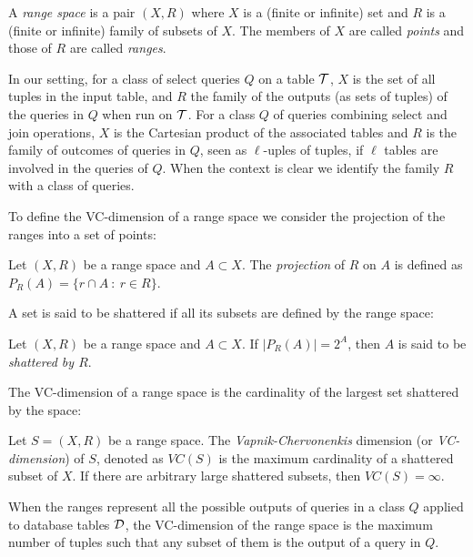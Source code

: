 \begin{definition}\label{definition:rangespace}
  A {\em range space} is a pair $(X,R)$ where $X$ is a (finite or infinite) set
  and $R$ is a (finite or infinite) family of subsets of $X$. The members of $X$
  are called {\em points} and those of $R$ are called {\em ranges}.
\end{definition}

In our setting, for a class of select queries $Q$ on a table ${\cal T}$, $X$ is the
set of all tuples in the input table, and $R$ the family of the outputs (as sets
of tuples) of the queries in $Q$ when run on 
${\cal T}$. For a class
$Q$ of queries combining select and join operations, $X$ is the Cartesian
product of the associated tables and $R$ is the family of outcomes of queries in
$Q$, seen as $\ell$-uples of tuples, if $\ell$ tables are involved in the
queries of $Q$.  When the context is clear we identify the family $R$ with a
class of queries.

To define the VC-dimension of a range space we consider the projection of the
ranges into a set of points:

\begin{definition}\label{definition:proj}
  Let $(X,R)$ be a range space and $A\subset X$. The {\em projection} of $R$ on
  $A$ is defined as $P_R(A)=\{r\cap A ~:~ r\in R\}$.
\end{definition}

A set is said to be shattered if all its subsets are defined by the range space:

\begin{definition}\label{definition:shatter}
  Let $(X,R)$ be a range space and $A\subset X$. If $|P_R(A)|=2^A$, then $A$ is
  said to be {\em shattered by $R$}.
\end{definition}

The VC-dimension of a range space is the cardinality of the largest set
shattered by the space:

\begin{definition}\label{definition:VCdim}
  Let $S=(X,R)$ be a range space. The {\em Vapnik-Chervonenkis} dimension (or
  {\em VC-dimension}) of $S$, denoted as $VC(S)$ is the maximum cardinality of a
  shattered subset of $X$. If there are arbitrary large shattered subsets, then
  $VC(S)=\infty$.
\end{definition}

When the ranges represent all the possible outputs of queries in a class $Q$
applied to database tables ${\cal D} $, the VC-dimension of the range space is the maximum
number of tuples such that any subset of them is the output of a query in $Q$.

